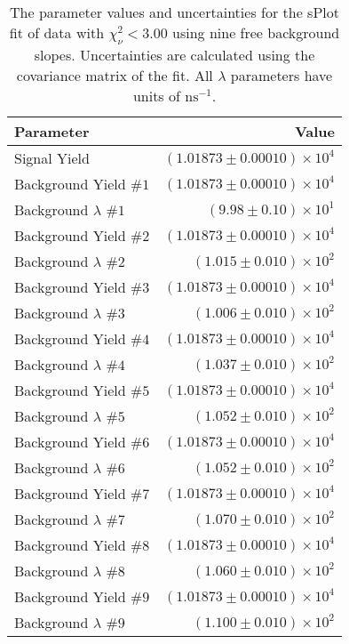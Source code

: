 
\begin{table}[ht]
    \begin{center}
        \begin{tabular}{lr}\toprule
            Parameter & Value \\\midrule
            Signal Yield & $(1.01873 \pm 0.00010) \times 10^{4}$ \\
            Background Yield $\#1$ & $(1.01873 \pm 0.00010) \times 10^{4}$ \\
            Background $\lambda$ $\#1$ & $(9.98 \pm 0.10) \times 10^{1}$ \\
            Background Yield $\#2$ & $(1.01873 \pm 0.00010) \times 10^{4}$ \\
            Background $\lambda$ $\#2$ & $(1.015 \pm 0.010) \times 10^{2}$ \\
            Background Yield $\#3$ & $(1.01873 \pm 0.00010) \times 10^{4}$ \\
            Background $\lambda$ $\#3$ & $(1.006 \pm 0.010) \times 10^{2}$ \\
            Background Yield $\#4$ & $(1.01873 \pm 0.00010) \times 10^{4}$ \\
            Background $\lambda$ $\#4$ & $(1.037 \pm 0.010) \times 10^{2}$ \\
            Background Yield $\#5$ & $(1.01873 \pm 0.00010) \times 10^{4}$ \\
            Background $\lambda$ $\#5$ & $(1.052 \pm 0.010) \times 10^{2}$ \\
            Background Yield $\#6$ & $(1.01873 \pm 0.00010) \times 10^{4}$ \\
            Background $\lambda$ $\#6$ & $(1.052 \pm 0.010) \times 10^{2}$ \\
            Background Yield $\#7$ & $(1.01873 \pm 0.00010) \times 10^{4}$ \\
            Background $\lambda$ $\#7$ & $(1.070 \pm 0.010) \times 10^{2}$ \\
            Background Yield $\#8$ & $(1.01873 \pm 0.00010) \times 10^{4}$ \\
            Background $\lambda$ $\#8$ & $(1.060 \pm 0.010) \times 10^{2}$ \\
            Background Yield $\#9$ & $(1.01873 \pm 0.00010) \times 10^{4}$ \\
            Background $\lambda$ $\#9$ & $(1.100 \pm 0.010) \times 10^{2}$ \\\bottomrule
        \end{tabular}
        \caption{The parameter values and uncertainties for the sPlot fit of data with $\chi^2_\nu < 3.00$ using nine free background slopes. Uncertainties are calculated using the covariance matrix of the fit. All $\lambda$ parameters have units of $\si{\nano\second}^{-1}$.}\label{tab:splot-fit-results-chisqdof-3.00-free-9}
    \end{center}
\end{table}
